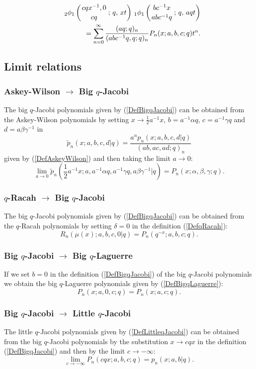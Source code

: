 \documentclass[envcountchap,graybox]{svmono}
\newcounter{rom}
\newcommand{\qhyp}[5]{\mbox{}_{#1}{\phi}_{#2}
\left(\genfrac{}{}{0pt}{}{#3}{#4}\,;\,q,\,#5\right)}
\newcommand{\qhyp}[5]{\,\mbox{}_{#1}\phi_{#2}\!\left(
  \genfrac{}{}{0pt}{}{#3}{#4};#5\right)}
\begin{document}
\begin{eqnarray}
\label{GenBigqJacobi2}
& &\qhyp{2}{1}{cqx^{-1},0}{cq}{xt}\,\qhyp{1}{1}{bc^{-1}x}{abc^{-1}q}{aqt}\nonumber\\
& &{}=\sum_{n=0}^{\infty}\frac{(aq;q)_n}{(abc^{-1}q,q;q)_n}P_n(x;a,b,c;q)t^n.
\end{eqnarray}

\subsection*{Limit relations}

\subsubsection*{Askey-Wilson $\rightarrow$ Big $q$-Jacobi}
The big $q$-Jacobi polynomials given by (\ref{DefBigqJacobi}) can be obtained from the
Askey-Wilson polynomials by setting $x\rightarrow \frac{1}{2}a^{-1}x$, $b=a^{-1}\alpha q$,
$c=a^{-1}\gamma q$ and $d=a\beta \gamma^{-1}$ in
$${\tilde p}_n(x;a,b,c,d|q)=\frac{a^np_n(x;a,b,c,d|q)}{(ab,ac,ad;q)_n}$$
given by (\ref{DefAskeyWilson}) and then taking the limit $a\rightarrow 0$:
$$\lim_{a\rightarrow 0}{\tilde p}_n(\textstyle\frac{1}{2}a^{-1}x;a,a^{-1}\alpha q,
a^{-1}\gamma q,a\beta \gamma^{-1}|q)=P_n(x;\alpha,\beta,\gamma;q).$$

\subsubsection*{$q$-Racah $\rightarrow$ Big $q$-Jacobi}
The big $q$-Jacobi polynomials given by (\ref{DefBigqJacobi}) can be obtained
from the $q$-Racah polynomials by setting $\delta=0$ in the definition
(\ref{DefqRacah}):
$$R_n(\mu(x);a,b,c,0|q)=P_n(q^{-x};a,b,c;q).$$

\subsubsection*{Big $q$-Jacobi $\rightarrow$ Big $q$-Laguerre}
If we set $b=0$ in the definition (\ref{DefBigqJacobi}) of
the big $q$-Jacobi polynomials we obtain the big $q$-Laguerre
polynomials given by (\ref{DefBigqLaguerre}):
\begin{equation}
P_n(x;a,0,c;q)=P_n(x;a,c;q).
\end{equation}

\subsubsection*{Big $q$-Jacobi $\rightarrow$ Little $q$-Jacobi}
The little $q$-Jacobi polynomials given by (\ref{DefLittleqJacobi}) can be obtained
from the big $q$-Jacobi polynomials by the substitution $x\rightarrow cqx$ in the definition
(\ref{DefBigqJacobi}) and then by the limit $c\rightarrow -\infty$:
\begin{equation}
\lim_{c\rightarrow -\infty}P_n(cqx;a,b,c;q)=p_n(x;a,b|q).
\end{equation}
\end{document}
